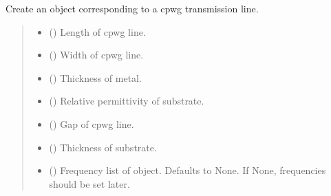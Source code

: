 \documentclass[letterpaper,10pt,english]{sphinxmanual}
\begin{document}
\begin{fulllineitems}
\begin{fulllineitems}
\end{fulllineitems}


\begin{fulllineitems}
\label{\detokenize{touchstone:touchstone.spfile.cpwgline}}
\pysigstartsignatures
{}
\pysigstopsignatures
\sphinxAtStartPar
Create an  object corresponding to a cpwg transmission line.
\begin{quote}\begin{description}
\begin{itemize}
\item {}
\sphinxAtStartPar
{} () \textendash{} Length of cpwg line.

\item {}
\sphinxAtStartPar
{} () \textendash{} Width of cpwg line.

\item {}
\sphinxAtStartPar
{} () \textendash{} Thickness of metal.

\item {}
\sphinxAtStartPar
{} () \textendash{} Relative permittivity of substrate.

\item {}
\sphinxAtStartPar
{} () \textendash{} Gap of cpwg line.

\item {}
\sphinxAtStartPar
{} () \textendash{} Thickness of substrate.

\item {}
\sphinxAtStartPar
{} (\sphinxstyleliteralemphasis{\sphinxupquote{, }}) \textendash{} Frequency list of object. Defaults to None. If None, frequencies should be set later.


\end{itemize}
\end{description}
\end{quote}
\end{fulllineitems}
\end{fulllineitems}
\end{document}
